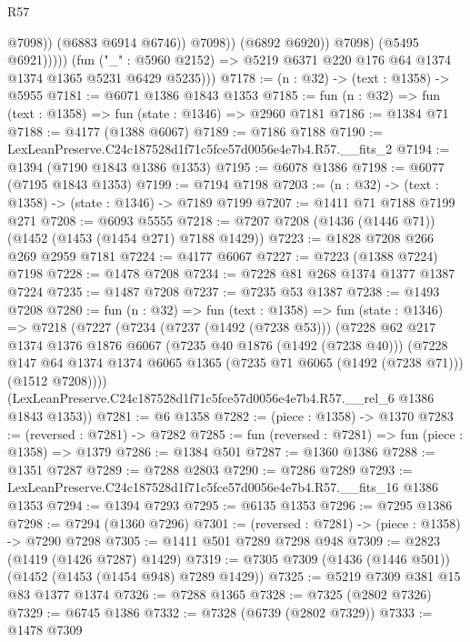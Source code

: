 \begin{lexlean}{R57}
\begin{coremodule}
                              @7098))
                          (@6883 @6914 @6746))
                        @7098))
                    (@6892 @6920))
                  @7098)
                (@5495 @6921)))))
        (fun ("_" : @5960 @2152) => @5219 @6371 @220 @176 @64 @1374 @1374 @1365 @5231 @6429 @5235)))
@7178 := (n : @32) -> (text : @1358) -> @5955
@7181 := @6071 @1386 @1843 @1353
@7185 := fun (n : @32) => fun (text : @1358) => fun (state : @1346) => @2960 @7181
@7186 := @1384 @71
@7188 := @4177 (@1388 @6067)
@7189 := @7186 @7188
@7190 := LexLeanPreserve.C24c187528d1f71c5fce57d0056e4e7b4.R57.__fits_2
@7194 := @1394 (@7190 @1843 @1386 @1353)
@7195 := @6078 @1386
@7198 := @6077 (@7195 @1843 @1353)
@7199 := @7194 @7198
@7203 := (n : @32) -> (text : @1358) -> (state : @1346) -> @7189 @7199
@7207 := @1411 @71 @7188 @7199 @271
@7208 := @6093 @5555
@7218 := @7207 @7208 (@1436 (@1446 @71)) (@1452 (@1453 (@1454 @271) @7188 @1429))
@7223 := @1828 @7208 @266 @269 @2959 @7181
@7224 := @4177 @6067
@7227 := @7223 (@1388 @7224) @7198
@7228 := @1478 @7208
@7234 := @7228 @81 @268 @1374 @1377 @1387 @7224
@7235 := @1487 @7208
@7237 := @7235 @53 @1387
@7238 := @1493 @7208
@7280 := fun (n : @32) =>
  fun (text : @1358) =>
  fun (state : @1346) =>
  @7218
    (@7227
      (@7234
        (@7237 (@1492 (@7238 @53)))
        (@7228
          @62
          @217
          @1374
          @1376
          @1876
          @6067
          (@7235 @40 @1876 (@1492 (@7238 @40)))
          (@7228
            @147
            @64
            @1374
            @1374
            @6065
            @1365
            (@7235 @71 @6065 (@1492 (@7238 @71)))
            (@1512 @7208))))
      (LexLeanPreserve.C24c187528d1f71c5fce57d0056e4e7b4.R57.__rel_6 @1386 @1843 @1353))
@7281 := @6 @1358
@7282 := (piece : @1358) -> @1370
@7283 := (reversed : @7281) -> @7282
@7285 := fun (reversed : @7281) => fun (piece : @1358) => @1379
@7286 := @1384 @501
@7287 := @1360 @1386
@7288 := @1351 @7287
@7289 := @7288 @2803
@7290 := @7286 @7289
@7293 := LexLeanPreserve.C24c187528d1f71c5fce57d0056e4e7b4.R57.__fits_16 @1386 @1353
@7294 := @1394 @7293
@7295 := @6135 @1353
@7296 := @7295 @1386
@7298 := @7294 (@1360 @7296)
@7301 := (reversed : @7281) -> (piece : @1358) -> @7290 @7298
@7305 := @1411 @501 @7289 @7298 @948
@7309 := @2823 (@1419 (@1426 @7287) @1429)
@7319 := @7305 @7309 (@1436 (@1446 @501)) (@1452 (@1453 (@1454 @948) @7289 @1429))
@7325 := @5219 @7309 @381 @15 @83 @1377 @1374
@7326 := @7288 @1365
@7328 := @7325 (@2802 @7326)
@7329 := @6745 @1386
@7332 := @7328 (@6739 (@2802 @7329))
@7333 := @1478 @7309

\end{coremodule}
\end{lexlean}
